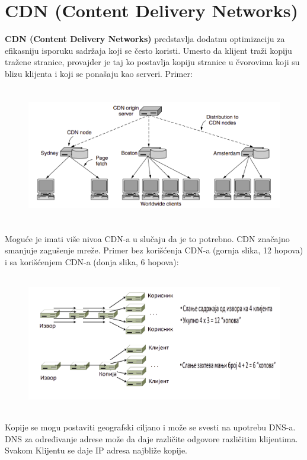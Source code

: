 \documentclass[a4paper]{article}
\begin{document}
\section{CDN (Content Delivery Networks)}
    \textbf{CDN (Content Delivery Networks)} predstavlja dodatnu optimizaciju za efikasniju 
    isporuku sadržaja koji se često koristi. Umesto da klijent traži kopiju tražene stranice,
    provajder je taj ko postavlja kopiju stranice u čvorovima koji su blizu klijenta i koji
    se ponašaju kao serveri. Primer:
    \begin{figure}[H]
        \begin{center}
            \includegraphics[width=120mm,height=60mm]{Slike/cdn1.png}
        \end{center}
    \end{figure}
    Moguće je imati više nivoa CDN-a u slučaju da je to potrebno. CDN značajno smanjuje zagušenje
    mreže. Primer bez korišćenja CDN-a (gornja slika, 12 hopova) i sa korišćenjem CDN-a 
    (donja slika, 6 hopova):
    \begin{figure}[H]
        \begin{center}
            \includegraphics[width=120mm,height=60mm]{Slike/cdn2.png}
        \end{center}
    \end{figure}
    Kopije se mogu postaviti geografski ciljano i može se svesti na upotrebu DNS-a.
    DNS za određivanje adrese može da daje različite odgovore različitim klijentima. Svakom
    Klijentu se daje IP adresa najbliže kopije.
\end{document}
